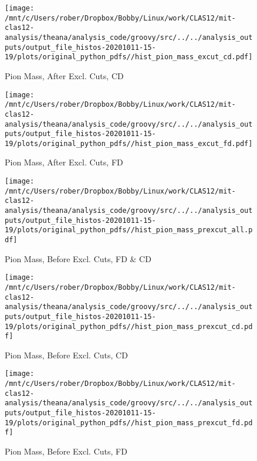 \documentclass{article}
\begin{document}
\begin{landscape}
    \begin{figure}[h]
        \centering

        \texttt{[image: /mnt/c/Users/rober/Dropbox/Bobby/Linux/work/CLAS12/mit-clas12-analysis/theana/analysis\_code/groovy/src/../../analysis\_outputs/output\_file\_histos-20201011-15-19/plots/original\_python\_pdfs//hist\_pion\_mass\_excut\_cd.pdf]}
        \captionsetup{textformat=empty,labelformat=blank}
        \caption{Pion Mass, After Excl. Cuts, CD}
    \end{figure}
    \clearpage
    
    \begin{figure}[h]
        \centering

        \texttt{[image: /mnt/c/Users/rober/Dropbox/Bobby/Linux/work/CLAS12/mit-clas12-analysis/theana/analysis\_code/groovy/src/../../analysis\_outputs/output\_file\_histos-20201011-15-19/plots/original\_python\_pdfs//hist\_pion\_mass\_excut\_fd.pdf]}
        \captionsetup{textformat=empty,labelformat=blank}
        \caption{Pion Mass, After Excl. Cuts, FD}
    \end{figure}
    \clearpage
    
    \begin{figure}[h]
        \centering

        \texttt{[image: /mnt/c/Users/rober/Dropbox/Bobby/Linux/work/CLAS12/mit-clas12-analysis/theana/analysis\_code/groovy/src/../../analysis\_outputs/output\_file\_histos-20201011-15-19/plots/original\_python\_pdfs//hist\_pion\_mass\_prexcut\_all.pdf]}
        \captionsetup{textformat=empty,labelformat=blank}
        \caption{Pion Mass, Before Excl. Cuts, FD \& CD}
    \end{figure}
    \clearpage
    
    \begin{figure}[h]
        \centering

        \texttt{[image: /mnt/c/Users/rober/Dropbox/Bobby/Linux/work/CLAS12/mit-clas12-analysis/theana/analysis\_code/groovy/src/../../analysis\_outputs/output\_file\_histos-20201011-15-19/plots/original\_python\_pdfs//hist\_pion\_mass\_prexcut\_cd.pdf]}
        \captionsetup{textformat=empty,labelformat=blank}
        \caption{Pion Mass, Before Excl. Cuts, CD}
    \end{figure}
    \clearpage
    
    \begin{figure}[h]
        \centering

        \texttt{[image: /mnt/c/Users/rober/Dropbox/Bobby/Linux/work/CLAS12/mit-clas12-analysis/theana/analysis\_code/groovy/src/../../analysis\_outputs/output\_file\_histos-20201011-15-19/plots/original\_python\_pdfs//hist\_pion\_mass\_prexcut\_fd.pdf]}
        \captionsetup{textformat=empty,labelformat=blank}
        \caption{Pion Mass, Before Excl. Cuts, FD}
    \end{figure}
    \clearpage
    

\end{landscape}
\end{document}
